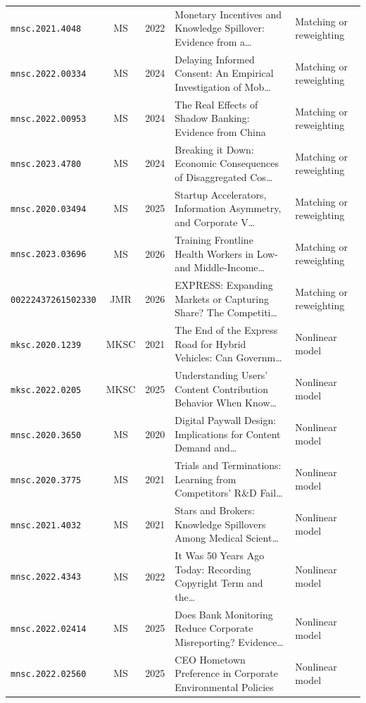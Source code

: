 \begin{longtable}{lccp{}l}
\texttt{mnsc.2021.4048} & MS & 2022 & \raggedright Monetary Incentives and Knowledge Spillover: Evidence from a\ldots{} & Matching or reweighting \\
\texttt{mnsc.2022.00334} & MS & 2024 & \raggedright Delaying Informed Consent: An Empirical Investigation of Mob\ldots{} & Matching or reweighting \\
\texttt{mnsc.2022.00953} & MS & 2024 & \raggedright The Real Effects of Shadow Banking: Evidence from China & Matching or reweighting \\
\texttt{mnsc.2023.4780} & MS & 2024 & \raggedright Breaking it Down: Economic Consequences of Disaggregated Cos\ldots{} & Matching or reweighting \\
\texttt{mnsc.2020.03494} & MS & 2025 & \raggedright Startup Accelerators, Information Asymmetry, and Corporate V\ldots{} & Matching or reweighting \\
\texttt{mnsc.2023.03696} & MS & 2026 & \raggedright Training Frontline Health Workers in Low- and Middle-Income\ldots{} & Matching or reweighting \\
\texttt{00222437261502330} & JMR & 2026 & \raggedright EXPRESS: Expanding Markets or Capturing Share? The Competiti\ldots{} & Matching or reweighting \\
\texttt{mksc.2020.1239} & MKSC & 2021 & \raggedright The End of the Express Road for Hybrid Vehicles: Can Governm\ldots{} & Nonlinear model \\
\texttt{mksc.2022.0205} & MKSC & 2025 & \raggedright Understanding Users' Content Contribution Behavior When Know\ldots{} & Nonlinear model \\
\texttt{mnsc.2020.3650} & MS & 2020 & \raggedright Digital Paywall Design: Implications for Content Demand and\ldots{} & Nonlinear model \\
\texttt{mnsc.2020.3775} & MS & 2021 & \raggedright Trials and Terminations: Learning from Competitors' R\&D Fail\ldots{} & Nonlinear model \\
\texttt{mnsc.2021.4032} & MS & 2021 & \raggedright Stars and Brokers: Knowledge Spillovers Among Medical Scient\ldots{} & Nonlinear model \\
\texttt{mnsc.2022.4343} & MS & 2022 & \raggedright It Was 50 Years Ago Today: Recording Copyright Term and the\ldots{} & Nonlinear model \\
\texttt{mnsc.2022.02414} & MS & 2025 & \raggedright Does Bank Monitoring Reduce Corporate Misreporting? Evidence\ldots{} & Nonlinear model \\
\texttt{mnsc.2022.02560} & MS & 2025 & \raggedright CEO Hometown Preference in Corporate Environmental Policies & Nonlinear model \\

\end{longtable}
